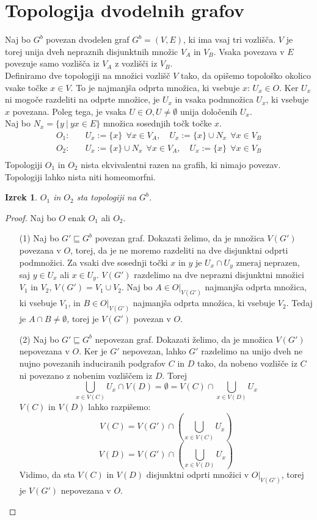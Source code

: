\documentclass[a4paper, 12pt]{book}
\newtheorem{theorem}{Izrek}[section]
\begin{document}
\section{Topologija dvodelnih grafov}
Naj bo $G^b$ povezan dvodelen graf $G^b = (V,E)$, ki ima vsaj tri vozlišča.
$V$ je torej unija dveh nepraznih disjunktnih množic $V_A$ in $V_B$. Vsaka
povezava v $E$ povezuje samo vozlišča iz $V_A$ z vozlišči iz $V_B$.\\
Definiramo dve topologiji na množici vozlišč $V$ tako, da opišemo
topološko okolico vsake točke $x \in V$. To je najmanjša odprta množica, ki
vsebuje $x$: $U_x \in O$. Ker $U_x$ ni mogoče razdeliti na odprte množice, je $U_x$
in vsaka podmnožica $U_x$, ki vsebuje $x$ povezana.
Poleg tega, je vsaka $U \in O, U \neq \emptyset$ unija določenih $U_x$.\\
Naj bo $N_x = \{y \  | \  yx \in E\}$ množica sosednjih točk točke $x$.\\
\[
  \begin{split}
  O_1:&\quad
  U_x:=\{x\}\ \ \forall x \in V_A, \quad
  U_x:=\{x\}\cup N_x\ \  \forall x \in V_B\\
  O_2:&\quad
  U_x:=\{x\}\cup N_x\ \  \forall x \in V_A, \quad
  U_x:=\{x\}\ \ \forall x \in V_B\\
\end{split}
\]
Topologiji $O_1$ in $O_2$ nista ekvivalentni razen na grafih, ki nimajo povezav.
Topologiji lahko nista niti homeomorfni.
\begin{theorem}
  $O_1$ in $O_2$ sta topologiji na $G^b$.
\end{theorem}
\begin{proof}
  Naj bo $O$ enak $O_1$ ali $O_2$.
  \begin{itemize}
    \item[(1)] Naj bo $G' \sqsubseteq G^b$ povezan graf. Dokazati želimo, da je
    množica $V(G')$ povezana v $O$, torej, da je ne moremo razdeliti na dve
    disjunktni odprti podmnožici. Za vsaki dve sosednji točki $x$ in $y$ je
    $U_x \cap U_y$ zmeraj neprazen, saj $y \in U_x$ ali $x \in U_y$. $V(G')$
    razdelimo na dve neprazni disjunktni množici $V_1$ in $V_2$,
    $V(G') = V_1 \cup V_2$. Naj bo $A \in O|_{V(G')}$
    najmanjša odprta množica, ki vsebuje $V_1$, in $B \in O|_{V(G')}$
    najmanjša odprta množica, ki vsebuje $V_2$. Tedaj je $A \cap B \neq \emptyset$,
    torej je $V(G')$ povezan v $O$.
    \item[(2)] Naj bo $G' \sqsubseteq G^b$ nepovezan graf. Dokazati želimo, da
    je množica $V(G')$ nepovezana v $O$. Ker je $G'$ nepovezan, lahko $G'$ razdelimo
    na unijo dveh ne nujno povezanih induciranih podgrafov $C$ in $D$ tako, da nobeno vozlišče iz $C$
    ni povezano z nobenim vozliščem iz $D$. Torej
    \[\bigcup_{x\in V(C)}U_x \cap V(D) = \emptyset = V(C) \cap \bigcup_{x\in V(D)}U_x\]
    $V(C)$ in $V(D)$ lahko razpišemo:
    \[V(C) = V(G') \cap \left(\bigcup_{x\in V(C)} U_x\right)\]
    \[V(D) = V(G') \cap \left(\bigcup_{x\in V(D)} U_x\right)\]
    Vidimo, da sta $V(C)$ in $V(D)$ disjunktni odprti množici v $O|_{V(G')}$,
    torej je $V(G')$ nepovezana v $O$.
  \end{itemize}
\end{proof}
\end{document}
